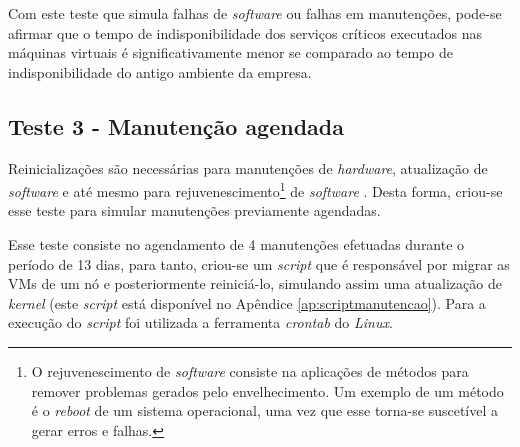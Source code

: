 Com este teste que simula falhas de \textit{software} ou falhas em manutenções, pode-se afirmar que o tempo de indisponibilidade dos serviços 
críticos executados nas máquinas virtuais é significativamente menor se comparado ao tempo de indisponibilidade do antigo ambiente da empresa.

\subsection{Teste 3 - Manutenção agendada}

Reinicializações são necessárias para manutenções de \textit{hardware}, atualização de \textit{software} e até mesmo para 
rejuvenescimento\footnote{O rejuvenescimento de \textit{software} consiste na aplicações de métodos para remover problemas gerados pelo 
envelhecimento. Um exemplo de um método é o \textit{reboot} de um sistema operacional, uma vez que esse torna-se suscetível a gerar erros e 
falhas.} de \textit{software} \cite{melo2014}. Desta forma, criou-se esse teste para simular manutenções previamente agendadas.


Esse teste consiste no agendamento de 4 manutenções efetuadas durante o período de 13 dias, para tanto, criou-se um \textit{script} que é 
responsável por migrar as \acp{VM} de um nó e posteriormente reiniciá-lo, simulando assim uma atualização de \textit{kernel} 
(este \textit{script} está disponível no Apêndice \ref{ap:scriptmanutencao}). 
Para a execução do \textit{script} foi utilizada a ferramenta \textit{crontab} do \textit{Linux}. 

